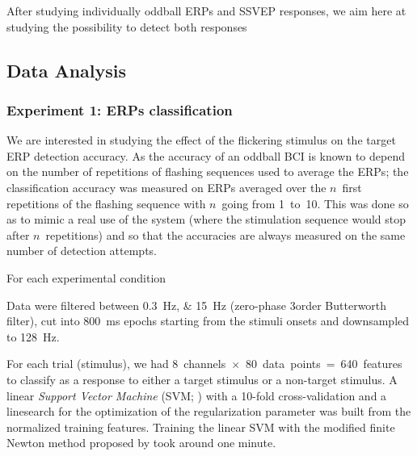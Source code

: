 \documentclass[10pt]{article}
\begin{document}
        After studying individually oddball \acp{ERP} and \ac{SSVEP} responses, we aim here at studying the possibility to detect both responses

    \subsection{Data Analysis}
    \label{sec:2.3DataAnalysis}

        \subsubsection{Experiment 1: ERPs classification}
        \label{sec:2.3.1AnalysisExp1}




        We are interested in studying the effect of the flickering stimulus on the target \ac{ERP} detection accuracy.
        As the accuracy of an oddball \ac{BCI} is known to depend on the number of repetitions of flashing sequences used to average the \acp{ERP}; the classification accuracy was measured on \acp{ERP} averaged over the $n$~first repetitions of the flashing sequence with $n$~going from 1~to~10.
        This was done so as to mimic a real use of the system (where the stimulation sequence would stop after $n$~repetitions) and so that the accuracies are always measured on the same number of detection attempts.

        For each experimental condition


        Data were filtered between \SIlist[list-units = single]{0.3;15}{\Hz} (zero-phase 3\rd order Butterworth filter), cut into \SI{800}{\ms} epochs starting from the stimuli onsets and downsampled to \SI{128}{\Hz}.

        For each trial (stimulus), we had 8~channels~$\times$~80~data~points~=~640~features to classify as a response to either a target stimulus or a non-target stimulus.
        A linear \emph{Support Vector Machine} (SVM; \cite{Cristianini2000,Suykens2002}) with a 10-fold cross-validation and a linesearch for the optimization of the regularization parameter was built from the normalized training features.
        Training the linear SVM with the modified finite Newton method proposed by \textcite{Keerthi2006} took around one minute.
\end{document}
